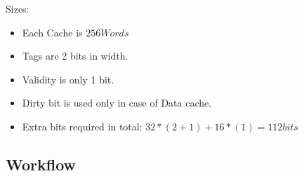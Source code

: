     Sizes:
    \begin{itemize}
        \item Each Cache is $256Words$
        \item Tags are 2 bits in width.
        \item Validity is only 1 bit.
        \item Dirty bit is used only in case of Data cache.
        \item Extra bits required in total: $32*(2+1) + 16*(1) = 112bits$
    \end{itemize}


\subsection{Workflow}
\label{workflowSection}


